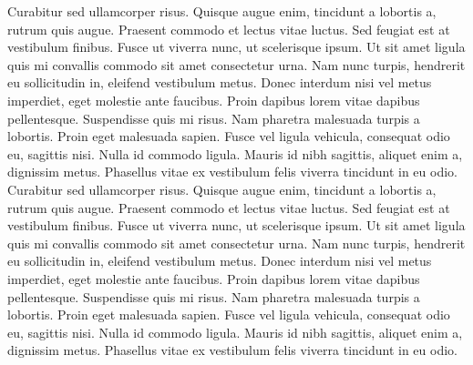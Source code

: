 \documentclass[12pt,letterpaper,oneside]{book}
\begin{document}
Curabitur sed ullamcorper risus. Quisque augue enim, tincidunt a lobortis a, rutrum quis augue. Praesent commodo et lectus vitae luctus. Sed feugiat est at vestibulum finibus. Fusce ut viverra nunc, ut scelerisque ipsum. Ut sit amet ligula quis mi convallis commodo sit amet consectetur urna. Nam nunc turpis, hendrerit eu sollicitudin in, eleifend vestibulum metus. Donec interdum nisi vel metus imperdiet, eget molestie ante faucibus. Proin dapibus lorem vitae dapibus pellentesque. Suspendisse quis mi risus. Nam pharetra malesuada turpis a lobortis. Proin eget malesuada sapien. Fusce vel ligula vehicula, consequat odio eu, sagittis nisi. Nulla id commodo ligula. Mauris id nibh sagittis, aliquet enim a, dignissim metus. Phasellus vitae ex vestibulum felis viverra tincidunt in eu odio. 
Curabitur sed ullamcorper risus. Quisque augue enim, tincidunt a lobortis a, rutrum quis augue. Praesent commodo et lectus vitae luctus. Sed feugiat est at vestibulum finibus. Fusce ut viverra nunc, ut scelerisque ipsum. Ut sit amet ligula quis mi convallis commodo sit amet consectetur urna. Nam nunc turpis, hendrerit eu sollicitudin in, eleifend vestibulum metus. Donec interdum nisi vel metus imperdiet, eget molestie ante faucibus. Proin dapibus lorem vitae dapibus pellentesque. Suspendisse quis mi risus. Nam pharetra malesuada turpis a lobortis. Proin eget malesuada sapien. Fusce vel ligula vehicula, consequat odio eu, sagittis nisi. Nulla id commodo ligula. Mauris id nibh sagittis, aliquet enim a, dignissim metus. Phasellus vitae ex vestibulum felis viverra tincidunt in eu odio. \cite{Qin2020} \cite{Tang2020}




 

\end{document}
